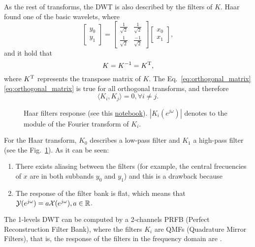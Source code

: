 As the rest of transforms, the DWT is also described by the filters of
$K$. Haar found one of the basic wavelets, where
\begin{equation}
  \begin{bmatrix}
    y_0 \\
    y_1
  \end{bmatrix}
  = 
  \begin{bmatrix} \frac{1}{\sqrt{2}} & \frac{1}{\sqrt{2}} \\ \frac{1}{\sqrt{2}} & \frac{-1}{\sqrt{2}} \end{bmatrix}
  \begin{bmatrix}
    x_0 \\
    x_1
  \end{bmatrix},
  \label{eq:Haar_transform}
\end{equation}
and it hold that
\begin{equation}
  K=K^{-1}=K^{\text T},
  \label{eq:orthogonal_matrix}
\end{equation}
where $K^{\text T}$ represents the transpose matrix of $K$. The
Eq.~\ref{eq:orthogonal_matrix} \ref{eq:orthogonal_matrix} is true for all orthogonal transforms,
and therefore
\begin{equation}
  \langle K_i, K_j\rangle = 0, \forall i\neq j.
\end{equation}

\begin{figure}
  \centering
  \caption{Haar filters response (see this
    \href{}{notebook}). $|K_i(e^{j\omega})|$ denotes to the
    module of the Fourier transform of $K_i$.}
  \label{fig:haar_filters_response}
\end{figure}

For the Haar transform, $K_0$ describes a low-pass filter and $K_1$ a
high-pass filter (see the Fig.~\ref{fig:haar_filters_response}). As it can be seen:
\begin{enumerate}
\item There exists aliasing between the filters (for example, the
  central frecuencies of $x$ are in both subbands $y_0$ and $y_1$) and
  this is a drawback because
\item The response of the filter bank is flat, which means that
  ${\cal Y}(e^{j\omega})=a{\cal X}(e^{j\omega}), a\in\mathbb{R}$.
\end{enumerate}

The 1-levels DWT can be computed by a 2-channels PRFB (Perfect
Reconstruction Filter Bank), where the filters $K_i$ are QMFs
(Quadrature Mirror Filters), that is, the response of the filters in the frequency domain are .

